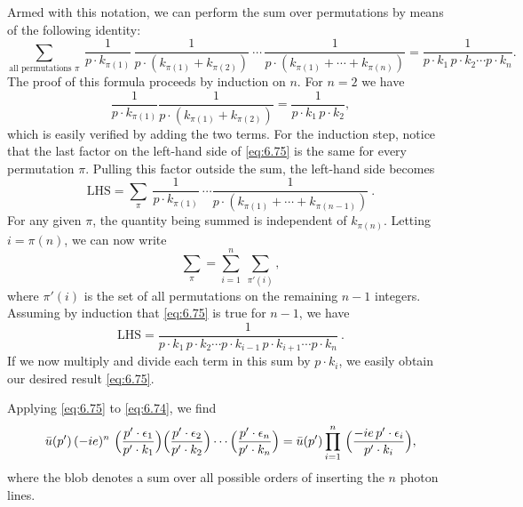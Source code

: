 Armed with this notation, we can perform the sum over permutations by means of
the following identity:
\begin{equation}
  \sum_{\text{all permutations }\pi}\ \frac{1}{p\cdot k_{\pi(1)}}\,
    \frac{1}{p\cdot(k_{\pi(1)}+k_{\pi(2)})}\ \cdots\,
    \frac{1}{p\cdot(k_{\pi(1)}+\cdots+k_{\pi(n)})}
  = \frac{1}{p\cdot k_1\,p\cdot k_2\cdots p\cdot k_n} .
  \label{eq:6.75}
\end{equation}
The proof of this formula proceeds by induction on $n$.  For $n=2$ we have
\begin{equation}
  \frac{1}{p\cdot k_{\pi(1)}}\frac{1}{p\cdot(k_{\pi(1)}+k_{\pi(2)})}
  = \frac{1}{p\cdot k_1\,p\cdot k_2},
\end{equation}
which is easily verified by adding the two terms.  For the induction step,
notice that the last factor on the left-hand side of \eqref{eq:6.75} is the
same for every permutation $\pi$.  Pulling this factor outside the sum, the
left-hand side becomes
\begin{equation}
  \text{LHS} = \sum_{\pi}\ \frac{1}{p\cdot k_{\pi(1)}}\ \cdots
    \frac{1}{p\cdot(k_{\pi(1)}+\cdots+k_{\pi(n-1)})}\ .
\end{equation}
For any given $\pi$, the quantity being summed is independent of
$k_{\pi(n)}$.  Letting $i = \pi(n)$, we can now write
\begin{equation}
  \sum_{\pi} = \sum_{i=1}^{n}\ \sum_{\pi'(i)},
\end{equation}
where $\pi'(i)$ is the set of all permutations on the remaining $n-1$
integers.  Assuming by induction that \eqref{eq:6.75} is true for $n-1$, we
have
\begin{equation}
  \text{LHS} = \frac{1}{p\cdot k_1\,p\cdot k_2\cdots p\cdot k_{i-1}\,
    p\cdot k_{i+1}\cdots p\cdot k_n}\ .
\end{equation}
If we now multiply and divide each term in this sum by $p\cdot k_i$, we easily
obtain our desired result \eqref{eq:6.75}.

Applying \eqref{eq:6.75} to \eqref{eq:6.74}, we find
\begin{equation}
  \bar{u}(p')\,(-ie)^n\ \Bigl( \frac{p'\cdot\epsilon_1}{p'\cdot k_1}
    \Bigr)\Bigl( \frac{p'\cdot\epsilon_2}{p'\cdot k_2} \Bigr)\cdots
    \Bigl( \frac{p'\cdot\epsilon_n}{p'\cdot k_n} \Bigr)
  = \bar{u}(p')\prod_{i=1}^{n}\ \Bigl( \frac{-ie\,p'\cdot\epsilon_i}
    {p'\cdot k_i} \Bigr),
  \label{eq:6.76}
\end{equation}
where the blob denotes a sum over all possible orders of inserting the $n$
photon lines.

